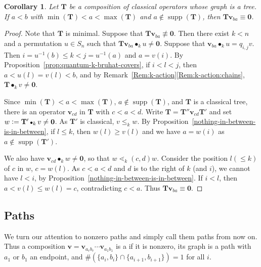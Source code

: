 \documentclass[12pt,oneside,reqno]{amsart}
\newtheorem{corollary}[theorem]{Corollary}
\theoremstyle{definition}
\numberwithin{equation}{section}
\newcommand{\qv}{{\mathbf v}}
\newcommand{\bzero}{{\mathbf 0}}
\DeclareMathOperator{\supp}{supp}
\DeclareMathOperator{\kactionop}{{\scriptstyle \bullet}}
\newcommand{\kaction}[1][k]{\kactionop_{#1}}
\newcommand{\defcolor}[1]{{\color{RoyalBlue}#1}}
\newcommand{\demph}[1]{\defcolor{{\sl #1}}}
\def\T{\mathbf{T}}
\begin{document}
\begin{corollary}
    \label{T*vq=0}
    Let $\T$ be a composition of classical operators whose graph is a tree.
    If $a<b$ with $\min(\T) < a < \max(\T)$
    and $a \notin \supp(\T)$, then $\T \qv_{ba} \equiv \bzero$.
\end{corollary}
\begin{proof}
  Note that $\T$ is minimal.
  Suppose that  $\T \qv_{ba} \not\equiv \bzero$.
  Then there exist $k<n$ and a permutation $u\in S_n$ such that $\T\qv_{ba}\kaction u\neq\bzero$.
  Suppose that $\qv_{ba}\kaction u = q_{i, j} v$.
  Then $i=u^{-1}(b)\leq k <j=u^{-1}(a)$ and $a=v(i)$.
  By Proposition~\ref{prop:quantum-k-bruhat-covers}, if $i<l<j$, then $a<u(l)=v(l)<b$, and 
  by  Remark~\ref{Rem:k-action}\ref{Rem:k-action:chains}, $\T\kaction v\neq\bzero$.

  Since  $\min(\T)<a<\max(\T)$, $a\not\in\supp(\T)$, and $\T$ is a classical tree, there is an operator $\qv_{cd}$ in $\T$ with $c<a<d$.
  Write $\T=\T'' \qv_{cd} \T'$ and set $w \vcentcolon= \T' \kaction v\neq \bzero$.
  As $\T'$ is classical, $v\leq_k w$.
  By Proposition~\ref{nothing-in-between-is-in-between},
  if $l\leq k$, then $w(l)\geq v(l)$ and we have $a=w(i)$ as $a\not\in\supp(\T')$.

  We also have $\qv_{cd}\kaction w\neq\bzero$, so that $w\lessdot_k (c,d)w$.
  Consider the position $l(\leq k)$ of $c$ in $w$, $c=w(l)$.
  As $c<a<d$ and $d$ is to the right of $k$ (and $i$), we cannot have $l<i$, by Proposition~\ref{nothing-in-between-is-in-between}.
  If $i<l$, then $a<v(l)\leq w(l)=c$, contradicting $c<a$.
  Thus $\T \qv_{ba}\equiv \bzero$.
\end{proof}


\subsection{Paths}
\label{ss:Paths}
We turn our attention to nonzero paths and simply call them paths from now on.
Thus a composition $\qv=\qv_{a_r b_r}\dotsb\qv_{a_1 b_1}$ is a \demph{path} if it is nonzero, its graph is a path with $a_1$ or $b_1$ an
endpoint, and $\#(\{a_i,b_i\}\cap\{a_{i+1},b_{i+1}\})=1$ for all $i$.
\end{document}
